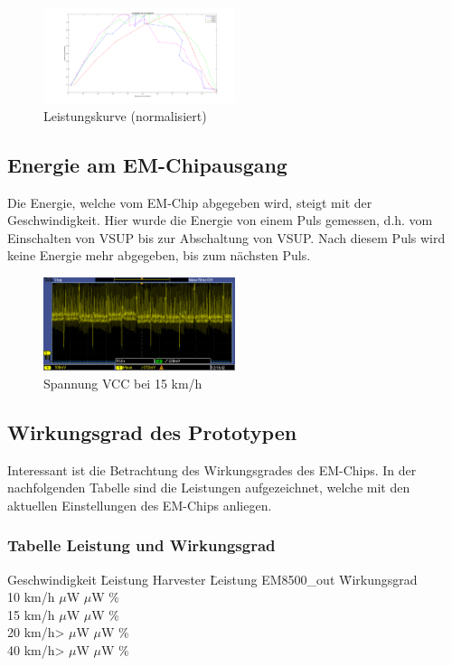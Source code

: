 \begin{figure}[ht]
    \includegraphics[width=0.5\textwidth]{4Resultate/imag/MPPHarvester.png} 
    \caption{Leistungskurve (normalisiert) }
    \label{resultat_Harvester_Spannung}
\end{figure}


\subsection{Energie am EM-Chipausgang}

Die Energie, welche vom EM-Chip abgegeben wird, steigt mit der Geschwindigkeit. Hier wurde die Energie von einem Puls gemessen, d.h. vom Einschalten von VSUP bis zur Abschaltung von VSUP. Nach diesem Puls wird keine Energie mehr abgegeben, bis zum nächsten Puls.

\begin{figure}[ht]
    \includegraphics[width=0.5\textwidth]{4Resultate/imag/SpannungVCC.png} 
    \caption{Spannung VCC bei 15 km/h}
    \label{resutat_emchip_spannung}
\end{figure}


\subsection{Wirkungsgrad des Prototypen}

Interessant ist die Betrachtung des Wirkungsgrades des EM-Chips. In der nachfolgenden Tabelle sind die Leistungen aufgezeichnet, welche mit den aktuellen Einstellungen des EM-Chips anliegen.

\subsubsection*{Tabelle Leistung und Wirkungsgrad }
\begin{tabbing}
    Geschwindigkeit \quad\= Leistung Harvester \quad\= Leistung EM8500\_out \quad\= Wirkungsgrad\\[0.8ex]
    10 km/h    $\mu$W    $\mu$W \thinspace\%  \\
    15 km/h    $\mu$W   $\mu$W \thinspace\%  \\
    20 km/h>  $\mu$W   $\mu$W \thinspace\%  \\
    40 km/h>  $\mu$W  $\mu$W \thinspace\%  \\
\end{tabbing}   

